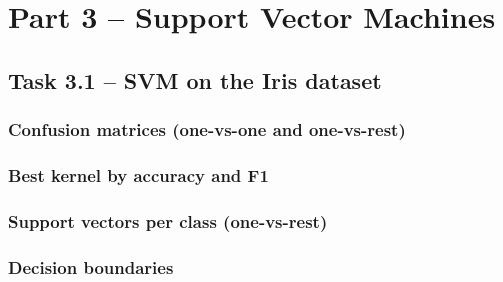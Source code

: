 \section{Part 3 -- Support Vector Machines}

\subsection{Task 3.1 -- SVM on the Iris dataset}

\subsubsection*{Confusion matrices (one-vs-one and one-vs-rest)}

\subsubsection*{Best kernel by accuracy and F1}

\subsubsection*{Support vectors per class (one-vs-rest)}

\subsubsection*{Decision boundaries}
